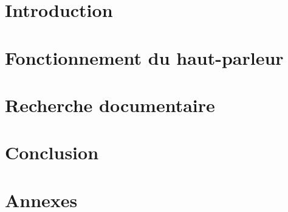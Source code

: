 \documentclass{report}
\begin{document}





\clearpage
\tableofcontents
\clearpage

\chapter{Introduction}



\chapter{Fonctionnement du haut-parleur}


\clearpage


\clearpage


\clearpage



\chapter{Recherche documentaire}


\clearpage



\chapter{Conclusion}




\nocite{*}


\chapter{Annexes}


\clearpage


\clearpage


\clearpage


\clearpage


\end{document}
